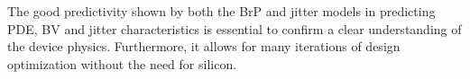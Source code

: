 \documentclass[10pt,a4paper,twocolumn]{article}
\begin{document}
The good predictivity shown by both the BrP and jitter models in predicting PDE, BV and jitter characteristics is essential to confirm a clear understanding of the device physics. Furthermore, it allows for many iterations of design optimization without the need for silicon.




\end{document}
